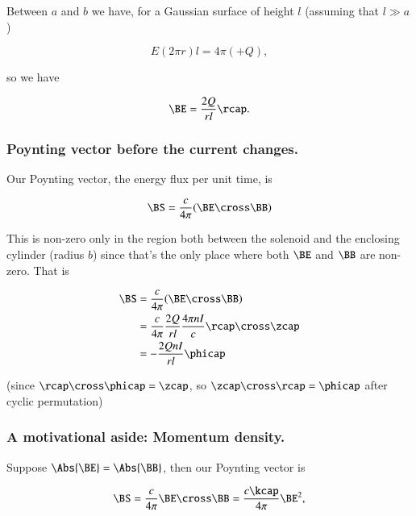 Between $a$ and $b$ we have, for a Gaussian surface of height $l$ (assuming that $l \gg a$)

\begin{equation}\label{eqn:relativisticElectrodynamicsT5:130}
E (2 \pi r) l = 4 \pi (+Q),
\end{equation}

so we have

\begin{equation}\label{eqn:relativisticElectrodynamicsT5:150}
\BE = \frac{2 Q }{r l} \rcap.
\end{equation}

\subsubsection{Poynting vector before the current changes.}

Our Poynting vector, the energy flux per unit time, is

\begin{equation}\label{eqn:relativisticElectrodynamicsT5:151}
\BS = \frac{c}{4 \pi} (\BE \cross \BB)
\end{equation}

This is non-zero only in the region both between the solenoid and the enclosing cylinder (radius $b$) since that's the only place where both $\BE$ and $\BB$ are non-zero.  That is

\begin{align*}
\BS &= \frac{c}{4 \pi} (\BE \cross \BB) \\
&=
\frac{c}{4 \pi} \frac{2 Q }{r l} \frac{4 \pi n I}{c} \rcap \cross \zcap \\
&= -\frac{2 Q n I}{r l} \phicap
\end{align*}

(since $\rcap \cross \phicap = \zcap$, so $\zcap \cross \rcap = \phicap$ after cyclic permutation)

\subsubsection{A motivational aside:  Momentum density.}

Suppose $\Abs{\BE} = \Abs{\BB}$, then our Poynting vector is

\begin{equation}\label{eqn:relativisticElectrodynamicsT5:170}
\BS = \frac{c}{4 \pi} \BE \cross \BB = \frac{ c \kcap}{4 \pi} \BE^2,
\end{equation}

